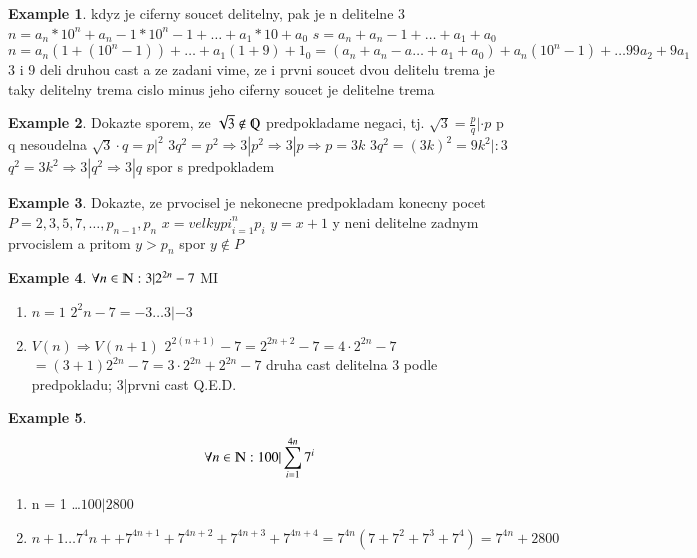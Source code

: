 \documentclass{article}
\theoremstyle{definition}
\newtheorem{exmp}{Example}[section]
\begin{document}
\begin{exmp}

    kdyz je ciferny soucet delitelny, pak je n delitelne 3
    $n = a_n * 10^n + a_n-1 * 10^n-1 + \dots + a_1*10 + a_0$
    $s = a_n +a_n-1 +\dots+ a_1 +a_0$
    $n = a_n (1 + (10^n-1))+ \dots + a_1(1+9)+1_0 = (a_n + a_n-a \dots + a_1 +a_0) + a_n (10^n-1) + \dots 99a_2 + 9 a_1$ 
    3 i 9 deli druhou cast a ze zadani vime, ze i prvni
    soucet dvou delitelu trema je taky delitelny trema
    cislo minus jeho ciferny soucet je delitelne trema

\end{exmp}


\begin{exmp}

    Dokazte sporem, ze $ \sqrt 3 \not \in \varmathbb{Q}$
    predpokladame negaci, tj.
    $\sqrt 3 = \frac p q  | \cdot p$ p q nesoudelna
    $\sqrt 3 \cdot q = p  | ^2$
    $3 q^2 = p^2 \Rightarrow 3|p^2 \Rightarrow 3|p \Rightarrow p = 3k$
    $3q^2 = (3k)^2 = 9k^2 | :3$
    $q^2 = 3k^2 \Rightarrow 3|q^2 \Rightarrow 3|q$
    spor s predpokladem

\end{exmp}

\begin{exmp}

    Dokazte, ze prvocisel je nekonecne 
    predpokladam konecny pocet
    $P = {2, 3, 5, 7, \dots, p_{n-1}, p_n}$
    $x = {velky pi}^n_{i = 1} p_i$
    $y = x+1$
    y neni delitelne zadnym prvocislem a pritom $y > p_n$
    spor $y \not \in P$
    
\end{exmp}

\begin{exmp}

    $\forall n \in \varmathbb{N}: 3| 2^{2n}-7$
    MI
    \begin{enumerate}
        \item $n=1 $
            $2^2n-7 = -3 \dots 3|-3$
        \item $V(n) \Rightarrow V(n+1)$
            $2^{2(n+1)} -7 = 2^{2n+2} - 7 = 4 \cdot 2 ^{2n} - 7$
            $=(3+1)2^{2n}-7 = 3 \cdot 2^{2n} + 2^{2n} - 7$
            druha cast delitelna 3 podle predpokladu; 3|prvni cast
            Q.E.D.
    \end{enumerate}

\end{exmp}

\begin{exmp}

    \[\forall n \in \varmathbb{N}: 100|\sum_{i=1}^{4n} 7^i\]
    \begin{enumerate}
        \item n = 1 \dots $100|2800$
        \item $n+1 \dots 7^4n+ + 7^{4n+1} + 7^{4n+2} + 7^{4n+3} + 7^{4n+4} = 7^{4n} (7 + 7^2+ 7^3 + 7^4) = 7^{4n} +2800$
    \end{enumerate}

\end{exmp}
\end{document}
